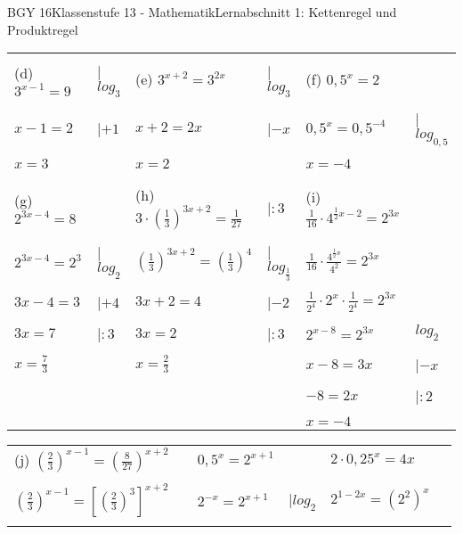 \documentclass[oneside,openany,headings=optiontotoc,11pt,numbers=noenddot]{scrreprt}
\begin{document}
\begin{worksheet}{BGY 16}{Klassenstufe 13 - Mathematik}{Lernabschnitt 1: Kettenregel und Produktregel}
\begin{framed}
\begin{tabularx}{\textwidth}{Xl|Xl|Xl}
				\hline
				& & & & & \\
				(d) \(3^{x-1} = 9\) & |\(log_3\) & (e) \(3^{x+2} = 3^{2x}\) & |\(log_3\) & (f) \(0,5^x=2\) & \\
				& & & & & \\
				\(x-1 = 2\) & |\(+1\) & \(x+2 = 2x\) & |\(-x\) & \(0,5^x = 0,5^{-4}\) & |\(log_{0,5}\)\\
				& & & & & \\
				\(x = 3\) & & \(x = 2\) & & \(x = -4\)\\
				& & & & & \\
				\hline
				& & & & & \\
				(g) \(2^{3x-4} = 8\) & & (h) \(3\cdot\left(\frac{1}{3}\right)^{3x+2} = \frac{1}{27}\) & |\(:3\) & (i) \(\frac{1}{16}\cdot{}4^{\frac{1}{2}x-2} = 2^{3x}\)\\
				& & & & & \\
				\(2^{3x-4} = 2^3\) & |\(log_2\) & \(\left(\frac{1}{3}\right)^{3x+2} = \left(\frac{1}{3}\right)^4\) & |\(log_\frac{1}{3}\) & \(\frac{1}{16}\cdot{}\frac{4^{\frac{1}{2}x}}{4^2} = 2^{3x}\)\\
				& & & & & \\
				\(3x-4 = 3\) & |\(+4\) & \(3x+2 = 4\) & |\(-2\) & \(\frac{1}{2^4}\cdot{}2^x\cdot{}\frac{1}{2^4} = 2^{3x}\)\\
				& & & & & \\
				\(3x = 7\) & |\(:3\) & \(3x = 2\) & |\(:3\) & \(2^{x-8} = 2^{3x}\) & \(log_2\)\\
				& & & & & \\
				\(x = \frac{7}{3}\) & & \(x = \frac{2}{3}\) & & \(x-8 = 3x\) & |\(-x\)\\
				& & & & & \\
				& & & & \(-8 = 2x\) & |\(:2\)\\
				& & & & & \\
				& & & & \(x = -4\)\\
			\end{tabularx}
			\begin{tabularx}{\textwidth}{Xl|Xl|Xl}
				(j) \(\left(\frac{2}{3}\right)^{x-1} = \left(\frac{8}{27}\right)^{x+2}\) & & \(0,5^x = 2^{x+1}\) & & \(2\cdot{}0,25^x = 4x\) & \\
				& & & & & \\
				\(\left(\frac{2}{3}\right)^{x-1} = \left[\left(\frac{2}{3}\right)^3\right]^{x+2}\) & & \(2^{-x} = 2^{x+1}\) & |\(log_2\) & \(2^{1-2x} = \left(2^2\right)^x\)\\
				& & & & & \\

\end{tabularx}
\end{framed}
\end{worksheet}
\end{document}
